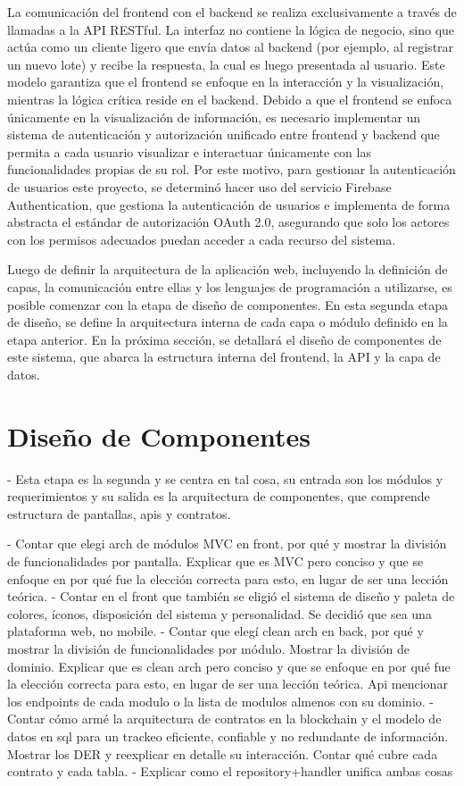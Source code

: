 La comunicación del frontend con el backend se realiza exclusivamente a través de llamadas a la API RESTful. La interfaz no contiene la lógica de negocio, sino que actúa como un cliente ligero que envía datos al backend (por ejemplo, al registrar un nuevo lote) y recibe la respuesta, la cual es luego presentada al usuario. Este modelo garantiza que el frontend se enfoque en la interacción y la visualización, mientras la lógica crítica reside en el backend. Debido a que el frontend se enfoca únicamente en la visualización de información, es necesario implementar un sistema de autenticación y autorización unificado entre frontend y backend que permita a cada usuario visualizar e interactuar únicamente con las funcionalidades propias de su rol. Por este motivo, para gestionar la autenticación de usuarios este proyecto, se determinó hacer uso del servicio Firebase Authentication, que gestiona la autenticación de usuarios e implementa de forma abstracta el estándar de autorización OAuth 2.0, asegurando que solo los actores con los permisos adecuados puedan acceder a cada recurso del sistema.

Luego de definir la arquitectura de la aplicación web, incluyendo la definición de capas, la comunicación entre ellas y los lenguajes de programación a utilizarse, es posible comenzar con la etapa de diseño de componentes. En esta segunda etapa de diseño, se define la arquitectura interna de cada capa o módulo definido en la etapa anterior. En la próxima sección, se detallará el diseño de componentes de este sistema, que abarca la estructura interna del frontend, la API y la capa de datos.

\section{Diseño de Componentes}
\label{sec:components-design}

- Esta etapa es la segunda y se centra en tal cosa, su entrada son los módulos y requerimientos y su salida es la arquitectura de componentes, que comprende estructura de pantallas, apis y contratos.



- Contar que elegi arch de módulos MVC en front, por qué y mostrar la división de funcionalidades por pantalla. Explicar que es MVC pero conciso y que se enfoque en por qué fue la elección correcta para esto, en lugar de ser una lección teórica.
- Contar en el front que también se eligió el sistema de diseño y paleta de colores, íconos, disposición del sistema y personalidad. Se decidió que sea una plataforma web, no mobile.
- Contar que elegí clean arch en back, por qué y mostrar la división de funcionalidades por módulo. Mostrar la división de dominio. Explicar que es clean arch pero conciso y que se enfoque en por qué fue la elección correcta para esto, en lugar de ser una lección teórica. Api mencionar los endpoints de cada modulo o la lista de modulos almenos con su dominio.
- Contar cómo armé la arquitectura de contratos en la blockchain y el modelo de datos en sql para un trackeo eficiente, confiable y no redundante de información. Mostrar los DER y reexplicar en detalle su interacción. Contar qué cubre cada contrato y cada tabla.
- Explicar como el repository+handler unifica ambas cosas


